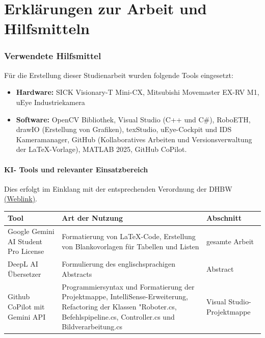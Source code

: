 \documentclass[12pt,a4paper]{report}
\newcommand{\csharp}{C\#}
\begin{document}




\clearpage %
\newpage
{}
\chapter*{Erklärungen zur Arbeit und Hilfsmitteln}

\subsection*{Verwendete Hilfsmittel}
Für die Erstellung dieser Studienarbeit wurden folgende Tools eingesetzt:
\begin{itemize}
	\item \textbf{Hardware:} SICK Visionary-T Mini-CX, Mitsubishi Movemaster EX-RV M1, uEye Industriekamera
	\item \textbf{Software:} OpenCV Bibliothek, Visual Studio (C++ und \csharp), RoboETH, drawIO (Erstellung von Grafiken), texStudio, uEye-Cockpit und IDS Kameramanager, GitHub (Kollaboratives Arbeiten und Versionsverwaltung der LaTeX-Vorlage), MATLAB 2025, GitHub CoPilot.
\end{itemize}
\subsubsection*{KI-	Tools und relevanter Einsatzbereich}
\label{KI-Tools und relevanter Einsatzbereich}
Dies erfolgt im Einklang mit der entsprechenden Verordnung der DHBW \href{https://www.dhbw.de/fileadmin/user_upload/Dokumente/Dokumente_fuer_Studierende/191212_Leitlinien_Praxismodule_Studien_Bachelorarbeiten.pdf}{(Weblink)}.
\begin{table}[H]
	\centering
	\begin{tabular}{|p{3cm}|p{6cm}|p{2.5cm}|}
		\hline
		\textbf{Tool} & \textbf{Art der Nutzung} & \textbf{Abschnitt} \\ \hline
		{Google Gemini AI Student Pro License} & {Formatierung von LaTeX-Code, Erstellung von Blankovorlagen für Tabellen und Listen} & {gesamte Arbeit} \\ \hline
		{DeepL AI Übersetzer} & {Formulierung des englischsprachigen Abstracts} & {Abstract} \\ \hline
		{Github CoPilot mit Gemini API} & {Programmiersyntax und Formatierung der Projektmappe, IntelliSense-Erweiterung, Refactoring der Klassen "Roboter.cs, Befehlspipeline.cs, Controller.cs und Bildverarbeitung.cs} & {Visual Studio-Projektmappe} \\ \hline
	\end{tabular}
\end{table}
\newpage
\end{document}
